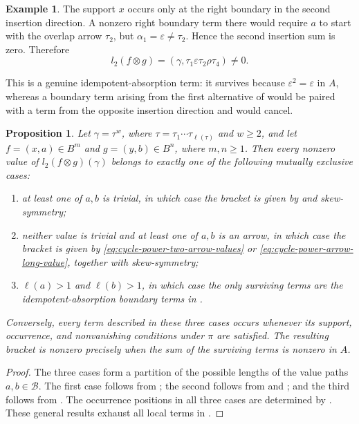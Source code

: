 \documentclass[11pt,a4paper,reqno]{amsart}
\newcommand{\mB}{\mathcal B}
\newcommand{\para}[2]{(#1,#2)}
\newcommand{\ep}{\varepsilon}
\newcommand{\taue}{\tau_{\ell(\tau)}}
\theoremstyle{plain}
\newtheorem{proposition}[proposition]{Proposition}
\theoremstyle{definition}
\newtheorem{example}[example]{Example}
\numberwithin{equation}{section}
\begin{document}
\begin{example}
		The support $x$ occurs only at the right boundary in the second
		insertion direction.  A nonzero right boundary term there would
		require $a$ to start with the overlap arrow $\tau_2$, but
		$\alpha_1=\ep\neq\tau_2$.
		Hence the second insertion sum is zero.  Therefore
		\[
		l_2(f\otimes g)
		=
		\para{\gamma}
		{\tau_1\ep\tau_2\rho\tau_4}
		\neq0.
		\]
		
		This is a genuine idempotent-absorption term: it survives because
		$\ep^2=\ep$ in $A$,
		whereas a boundary term arising from the first alternative of
		 would be paired with a term from the
		opposite insertion direction and would cancel.
	\end{example}
	\begin{proposition}
		\label{prop:higher-primitive-cycle-power}
		Let $\gamma=\tau^w$, where $\tau=\tau_1\cdots\taue$ and $w\geq2$,
		and let $f=\para{x}{a}\in B^m$ and $g=\para{y}{b}\in B^n$, where
		$m,n\geq1$.  Then every nonzero value of
		$l_2(f\otimes g)(\gamma)$ belongs to exactly one of the following
		mutually exclusive cases:
		
		\begin{enumerate}
			\item at least one of $a,b$ is trivial, in which case the bracket is
			given by
			and skew-symmetry;
			
			\item neither value is trivial and at least one of $a,b$ is an
			arrow, in which case the bracket is given by
			\eqref{eq:cycle-power-two-arrow-values} or
			\eqref{eq:cycle-power-arrow-long-value}, together with
			skew-symmetry;
			
			\item $\ell(a)>1$ and $\ell(b)>1$, in which case the only surviving terms are the idempotent-absorption
			boundary terms in
			.
		\end{enumerate}
		
		Conversely, every term described in these three cases occurs whenever
		its support, occurrence, and nonvanishing conditions under $\pi$ are satisfied.  The
		resulting bracket is nonzero precisely when the sum of the surviving terms
		is nonzero in $A$.
	\end{proposition}
	
	\begin{proof}
		The three cases form a partition of the possible lengths of the value paths $a,b\in\mB$.  The first case follows from
		; the second follows from
		 and
		; and the third follows from
		.  The occurrence positions in all
		three cases are determined by
		.  These general results exhaust all local
		terms in .
	\end{proof}
\end{document}
